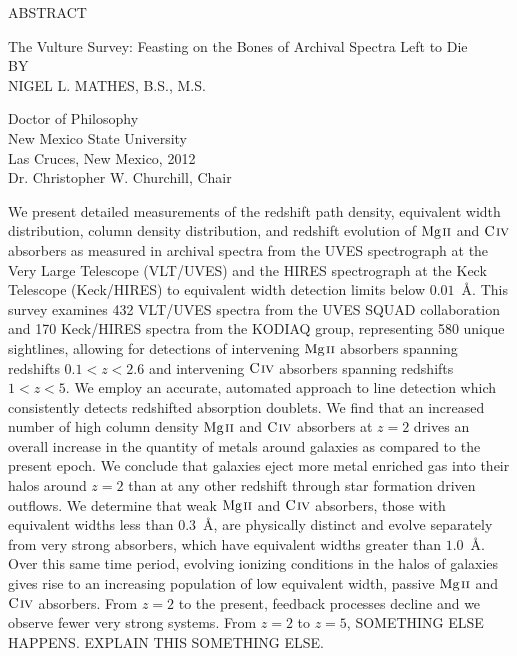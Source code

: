 \begin{center}
ABSTRACT
\end{center}

\bigskip

\begin{center}
The Vulture Survey: Feasting on the Bones of Archival Spectra Left to Die\\
\bigskip
BY\\
\bigskip
NIGEL L. MATHES, B.S., M.S.
\end{center}

\bigskip

\begin{center}
Doctor of Philosophy\\
New Mexico State University\\
Las Cruces, New Mexico, 2012\\
Dr. Christopher W. Churchill, Chair
\end{center}

\bigskip


We present detailed measurements of the redshift path density, equivalent width distribution, column density distribution, and redshift evolution of ${\hbox{{\rm Mg}\kern 0.1em{\sc ii}}}$ and ${\hbox{{\rm C}\kern 0.1em{\sc iv}}}$ absorbers as measured in archival spectra from the UVES spectrograph at the Very Large Telescope (VLT/UVES) and the HIRES spectrograph at the Keck Telescope (Keck/HIRES) to equivalent width detection limits below $0.01$~{\AA}. This survey examines 432 VLT/UVES spectra from the UVES SQUAD collaboration and 170 Keck/HIRES spectra from the KODIAQ group, representing 580 unique sightlines, allowing for detections of intervening ${\hbox{{\rm Mg}\kern 0.1em{\sc ii}}}$ absorbers spanning redshifts $0.1 < z < 2.6$ and intervening ${\hbox{{\rm C}\kern 0.1em{\sc iv}}}$ absorbers spanning redshifts $1 < z < 5$. We employ an accurate, automated approach to line detection which consistently detects redshifted absorption doublets. We find that an increased number of high column density ${\hbox{{\rm Mg}\kern 0.1em{\sc ii}}}$ and ${\hbox{{\rm C}\kern 0.1em{\sc iv}}}$ absorbers at $z = 2$ drives an overall increase in the quantity of metals around galaxies as compared to the present epoch. We conclude that galaxies eject more metal enriched gas into their halos around $z = 2$ than at any other redshift through star formation driven outflows. We determine that weak ${\hbox{{\rm Mg}\kern 0.1em{\sc ii}}}$ and ${\hbox{{\rm C}\kern 0.1em{\sc iv}}}$ absorbers, those with equivalent widths less than $0.3$~{\AA}, are physically distinct and evolve separately from very strong absorbers, which have equivalent widths greater than $1.0$~{\AA}. Over this same time period, evolving ionizing conditions in the halos of galaxies gives rise to an increasing population of low equivalent width, passive ${\hbox{{\rm Mg}\kern 0.1em{\sc ii}}}$ and ${\hbox{{\rm C}\kern 0.1em{\sc iv}}}$ absorbers. From $z = 2$ to the present, feedback processes decline and we observe fewer very strong systems. From $z = 2$ to $z = 5$, SOMETHING ELSE HAPPENS. EXPLAIN THIS SOMETHING ELSE.
